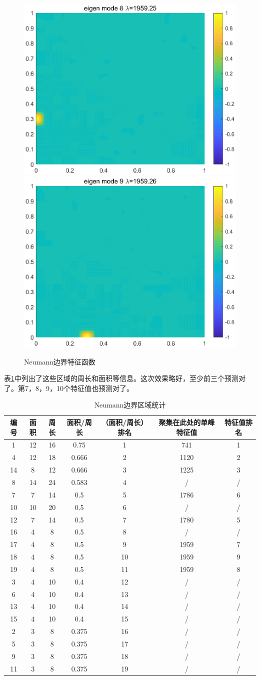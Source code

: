 \documentclass[12pt,a4paper]{article}
\begin{document}
\begin{figure}[htbp]
\includegraphics[width=0.3\linewidth]{locate/eigN8}
\includegraphics[width=0.3\linewidth]{locate/eigN9}
\caption{Neumann边界特征函数}
\label{eN}
\end{figure}

表\ref{tN}中列出了这些区域的周长和面积等信息。这次效果略好，至少前三个预测对了。第7，8，9，10个特征值也预测对了。

\begin{table}
\centering
\begin{tabular}{c|c|c|c|c|c|c}
\hline
编号 & 面积 & 周长 & 面积/周长 & （面积/周长）排名 & 聚集在此处的单峰特征值 & 特征值排名 \\
\hline
1 & 12 & 16 & 0.75 & 1 & 741 & 1 \\
4 & 12 & 18 & 0.666 & 2 & 1120 & 2 \\
14 & 8 & 12 & 0.666 & 3 & 1225 & 3 \\
8 & 14 & 24 & 0.583 & 4 & / & / \\
7 & 7 & 14 & 0.5 & 5 & 1786 & 6 \\
10 & 10 & 20 & 0.5 & 6 & / & / \\
12 & 7 & 14 & 0.5 & 7 & 1780 & 5 \\
16 & 4 & 8 & 0.5 & 8 & / & / \\
17 & 4 & 8 & 0.5 & 9 & 1959 & 7 \\
18 & 4 & 8 & 0.5 & 10 & 1959 & 9 \\
19 & 4 & 8 & 0.5 & 11 & 1959 & 8 \\
3 & 4 & 10 & 0.4 & 12 & / & / \\
6 & 4 & 10 & 0.4 & 13 & / & / \\
13 & 4 & 10 & 0.4 & 14 & / & / \\
15 & 4 & 10 & 0.4 & 15 & / & / \\
2 & 3 & 8 & 0.375 & 16 & / & / \\
5 & 3 & 8 & 0.375 & 17 & / & / \\
9 & 3 & 8 & 0.375 & 18 & / & / \\
11 & 3 & 8 & 0.375 & 19 & / & / \\
\hline 
\end{tabular}
\caption{Neumann边界区域统计}
\label{tN}
\end{table}
\end{document}
